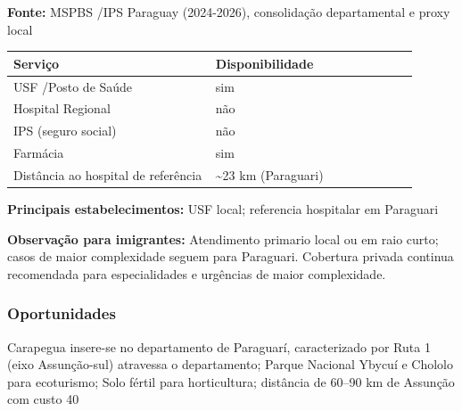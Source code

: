 \textbf{Fonte:} MSPBS /\allowbreak  IPS Paraguay (2024-2026), consolidação
departamental e proxy local

{\def\LTcaptype{none} %
\begin{longtable}{@{}>{\raggedright\arraybackslash}p{0.45\linewidth} >{\raggedright\arraybackslash}p{0.45\linewidth}@{}}
\toprule\noalign{}
Serviço & Disponibilidade \\
\midrule\noalign{}
\endhead
\bottomrule\noalign{}
\endlastfoot
USF /\allowbreak  Posto de Saúde & sim \\
Hospital Regional & não \\
IPS (seguro social) & não \\
Farmácia & sim \\
Distância ao hospital de referência & \textasciitilde23 km
(Paraguari) \\
\end{longtable}
}

\textbf{Principais estabelecimentos:} USF local; referencia hospitalar
em Paraguari

\textbf{Observação para imigrantes:} Atendimento primario local ou em
raio curto; casos de maior complexidade seguem para Paraguari. Cobertura
privada continua recomendada para especialidades e urgências de maior
complexidade.
\newpage

\subsubsection*{Oportunidades}\label{oport-carapegua-0905}
Carapegua insere-se no departamento de Paraguarí, caracterizado por Ruta 1 (eixo Assunção-sul) atravessa o departamento; Parque Nacional Ybycuí e Chololo para ecoturismo; Solo fértil para horticultura; distância de 60–90 km de Assunção com custo 40%

